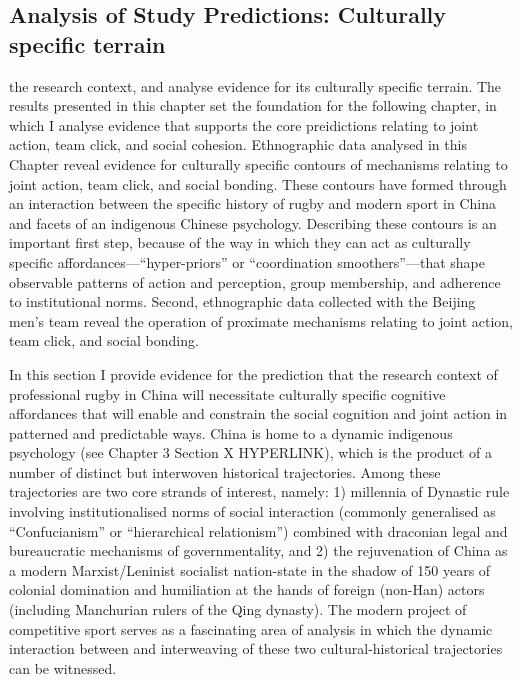                                           \begin{CJK}{UTF8}{gbsn}


\section{Analysis of Study Predictions: Culturally specific terrain}

the research context, and analyse evidence for its culturally specific terrain.  The results presented in this chapter set the foundation for the following chapter, in which I analyse evidence that supports the core preidictions relating to joint action, team click, and social cohesion.
Ethnographic data analysed in this Chapter reveal evidence for culturally specific contours of mechanisms relating to joint action, team click, and social bonding.  These contours have formed through an interaction between the specific history of rugby and modern sport in China and facets of an indigenous Chinese psychology.  Describing these contours is an important first step, because of the way in which they can act as culturally specific affordances---``hyper-priors'' or ``coordination smoothers''---that shape observable patterns of action and perception, group membership, and adherence to institutional norms.  Second, ethnographic data collected with the Beijing men's team reveal the operation of proximate mechanisms relating to joint action, team click, and social bonding.




In this section I provide evidence for the prediction that the research context of professional rugby in China will necessitate culturally specific cognitive affordances that will enable and constrain the social cognition and joint action in patterned and predictable ways.  China is home to a dynamic indigenous psychology (see Chapter 3 Section X HYPERLINK), which is the product of a number of distinct but interwoven historical trajectories.  Among these trajectories are two core strands of interest, namely: 1) millennia of Dynastic rule involving institutionalised norms of social interaction (commonly generalised as ``Confucianism'' or ``hierarchical relationism'') combined with draconian legal and bureaucratic mechanisms of governmentality, and 2) the rejuvenation of China as a modern Marxist/Leninist socialist nation-state in the shadow of 150 years of colonial domination and humiliation at the hands of foreign (non-Han) actors (including Manchurian rulers of the Qing dynasty).  The modern project of competitive sport serves as a fascinating area of analysis in which the dynamic interaction between and interweaving of these two cultural-historical trajectories can be witnessed.


\end{CJK}
